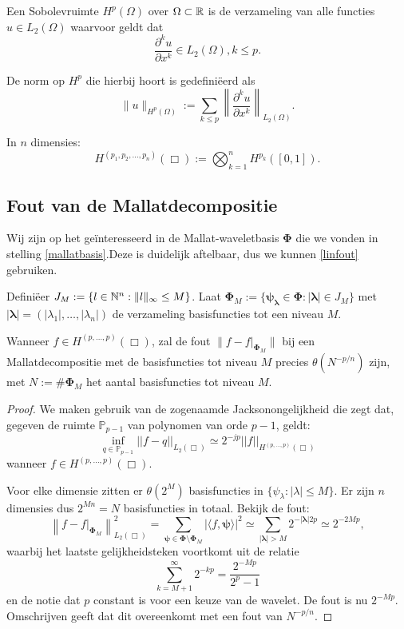 \begin{definitie}[Sobolevruimte]
Een Sobolevruimte $H^p(\Omega)$ over $\Omega \subset \mathbb{R}$ is de verzameling van alle functies $u \in L_2(\Omega)$ waarvoor geldt dat
\[
	\frac{\partial^k u}{\partial x^k} \in L_2(\Omega), k \leq p.
\]

De norm op $H^p$ die hierbij hoort is gedefini\"eerd als
\[
	\| u \|_{H^p(\Omega)} := \sum_{k \leq p} \left\| \frac{\partial^k u}{\partial x^k} \right\|_{L_2(\Omega)}.
\]

In $n$ dimensies:
\[
	H^{(p_1,p_2,\ldots,p_n)}(\Box) := \bigotimes_{k=1}^n H^{p_k}([0,1]).
\]
\end{definitie}

\subsection{Fout van de Mallatdecompositie}
Wij zijn op het ge\"interesseerd in de Mallat-waveletbasis $\boldsymbol\Phi$ die we vonden in stelling \ref{mallatbasis}.Deze is duidelijk aftelbaar, dus we kunnen \eqref{linfout} gebruiken. 

Defini\"eer $J_M := \{ l \in \mathbb{N}^n: \| l \|_\infty \leq M \}$. Laat $\boldsymbol\Phi_M := \{ \boldsymbol{\psi}_{\boldsymbol{\lambda}} \in \boldsymbol\Phi: |\boldsymbol\lambda| \in J_M \}$ met \mbox{$|\boldsymbol\lambda| = (|\lambda_1|, \ldots, |\lambda_n|)$} de verzameling basisfuncties tot een niveau $M$.

\begin{stelling}
\label{thm:foutmallat}
Wanneer $f \in H^{(p,\ldots,p)}(\Box)$, zal de fout \mbox{$\| f - f|_{\boldsymbol\Phi_M} \|$} bij een Mallatdecompositie met de basisfuncties tot niveau $M$ precies $\theta(N^{-p/n})$ zijn, met \mbox{$N := \# \boldsymbol\Phi_M$} het aantal basisfuncties tot niveau $M$.
\end{stelling}
\begin{proof}

  We maken gebruik van de zogenaamde Jacksonongelijkheid \cite{jackson} die zegt dat, gegeven de ruimte $\mathbb{P}_{p-1}$ van polynomen van orde $p-1$, geldt: 
  \[
  \inf_{q \in \mathbb{P}_{p-1}} ||f - q||_{L_2(\Box)} \simeq 2^{-jp} ||f||_{H^{(p,\ldots,p)}(\Box)}
  \]
  wanneer $f \in H^{(p,\ldots,p)}(\Box)$.

  Voor elke dimensie zitten er $\theta(2^M)$ basisfuncties in $\{ \psi_\lambda: |\lambda| \leq M \}$. Er zijn $n$ dimensies dus $2^{Mn} = N$ basisfuncties in totaal. Bekijk de fout:
  \[
  \left\| f - f|_{\boldsymbol\Phi_M} \right\|^2_{L_2(\Box)} 
  = \sum_{{\boldsymbol\psi} \in \boldsymbol\Phi \setminus \boldsymbol\Phi_M} | \langle f, \boldsymbol\psi \rangle |^2 
  \simeq \sum_{|\boldsymbol\lambda| > M} 2^{-|\boldsymbol\lambda|2p} \simeq 2^{-2Mp},
  \]
  waarbij het laatste gelijkheidsteken voortkomt uit de relatie
  \[
  \sum_{k=M+1}^\infty 2^{- kp} = \frac{2^{-Mp}}{2^p-1}
  \]
  en de notie dat $p$ constant is voor een keuze van de wavelet. 
  De fout is nu $2^{-Mp}$. Omschrijven geeft dat dit overeenkomt met een fout van $N^{-p/n}$.
\end{proof}

